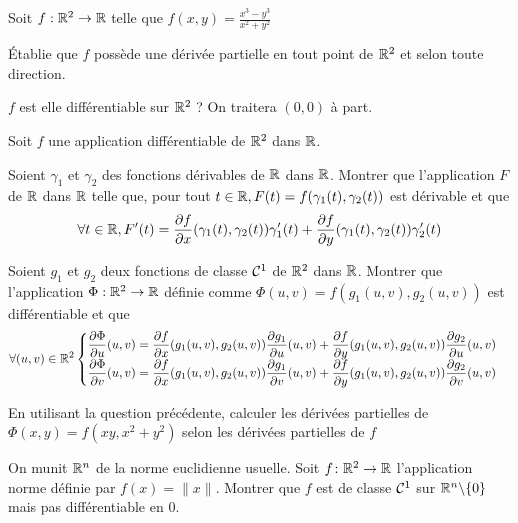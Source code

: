 \documentclass{report}
\begin{document}
\begin{exo}
    Soit \(f:\mathbb{R}^2\to\mathbb{R}\) telle que \(f(x,y)=\frac{x^3-y^3}{x^2+y^2}\)
    \begin{q}{1}
        Établie que \(f\) possède une dérivée partielle en tout point de \(\mathbb{R}^2\)
        et selon toute direction.
    \end{q}
    \begin{q}{2}
        \(f\) est elle différentiable sur \(\mathbb{R}^2\) ? On traitera \((0,0)\) à part.
    \end{q}
\end{exo}

\begin{exo}
    Soit \(f\) une application différentiable de \(\mathbb{R}^2\) dans \(\mathbb{R}\).
    \begin{q}{1}
        Soient \(\gamma_1\) et \(\gamma_2\) des fonctions dérivables de \(\mathbb{R}\)
        dans \(\mathbb{R}\). Montrer que l'application \(F\) de \(\mathbb{R}\) dans \(\mathbb{R}\) telle
        que, pour tout \(t\in\mathbb{R}, F(t)=f(\gamma_1(t), \gamma_2(t))\) est dérivable
        et que \[\forall t\in\mathbb{R}, F'(t)=
        \frac{\partial f}{\partial x}(\gamma_1(t), \gamma_2(t))\gamma_1'(t) +
        \frac{\partial f}{\partial y}(\gamma_1(t), \gamma_2(t))\gamma_2'(t)\]
    \end{q}
    \begin{q}{2}
        Soient \(g_1\) et \(g_2\) deux fonctions de classe \(\mathcal{C}^1\) de \(\mathbb{R}^2\)
        dans \(\mathbb{R}\). Montrer que l'application \(\Phi:\mathbb{R}^2\to\mathbb{R}\) définie comme
        \(\Phi(u,v)=f(g_1(u,v),g_2(u,v))\) est différentiable et que
        \[\forall (u,v)\in\mathbb{R}^2 \begin{cases}
        \displaystyle\frac{\partial\Phi}{\partial u}(u,v)=\frac{\partial f}{\partial x}(
            g_1(u,v),g_2(u,v))\frac{\partial g_1}{\partial u}(u,v)
            +\frac{\partial f}{\partial y}(
            g_1(u,v),g_2(u,v))\frac{\partial g_2}{\partial u}(u,v)
        \\
        \displaystyle\frac{\partial\Phi}{\partial v}(u,v)=\frac{\partial f}{\partial x}(
            g_1(u,v),g_2(u,v))\frac{\partial g_1}{\partial v}(u,v)
            +\frac{\partial f}{\partial y}(
            g_1(u,v),g_2(u,v))\frac{\partial g_2}{\partial v}(u,v)
        \end{cases}\]
    \end{q}
    \begin{q}{3}
        En utilisant la question précédente, calculer les dérivées partielles de
        \(\Phi(x,y)=f(xy, x^2+y^2)\) selon les dérivées partielles de \(f\)
    \end{q}
\end{exo}

\begin{exo}
    On munit \(\mathbb{R}^n\) de la norme euclidienne usuelle. Soit \(f\colon\mathbb{R}^2\to\mathbb{R}\)
    l'application norme définie par \(f(x)=\|x\|\). Montrer que \(f\)
    est de classe \(\mathcal{C}^1\) sur \(\mathbb{R}^n\backslash\{0\}\) mais pas différentiable en 0.
\end{exo}
\end{document}

